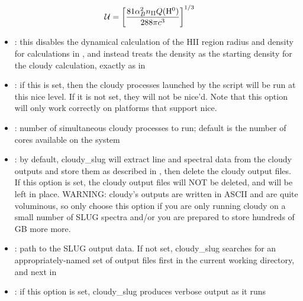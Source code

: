 \documentclass[letterpaper,10pt,english]{sphinxmanual}
\begin{document}
\begin{gather}
\begin{split}\mathcal{U} = \left[\frac{81 \alpha_B^2 n_{\mathrm{II}}
Q(\mathrm{H}^0)}{288 \pi c^3}\right]^{1/3}\end{split}\notag
\end{gather}\begin{itemize}
\item {} 
: this disables the dynamical calculation of the
HII region radius and density for calculations in
{\hyperref[cloudy:sssec-cloudy-cluster-mode]{\emph{}}}, and instead treats the density as
the starting density for the cloudy calculation, exactly as in
{\hyperref[cloudy:sssec-cloudy-integrated-mode]{\emph{}}}

\item {} 
: if this is set, then the
cloudy processes launched by the script will be run at this nice
level. If it is not set, they will not be nice'd. Note that this
option will only work correctly on platforms that support nice.

\item {} 
: number of simultaneous cloudy processes
to run; default is the number of cores available on the system

\item {} 
: by default, cloudy\_slug will extract line and
spectral data from the cloudy outputs and store them as described in
{\hyperref[cloudy:ssec-cloudy-output]{\emph{}}}, then delete the cloudy output files. If
this option is set, the cloudy output files will NOT be deleted, and
will be left in place. WARNING: cloudy's outputs are written in
ASCII and are quite voluminous, so only choose this option if you
are only running cloudy on a small number of SLUG spectra and/or you
are prepared to store hundreds of GB more more.

\item {} 
: path to the SLUG output data. If not set,
cloudy\_slug searches for an appropriately-named set of output files
first in the current working directory, and next in

\item {} 
: if this option is set, cloudy\_slug produces
verbose output as it runs

\end{itemize}
\end{document}
